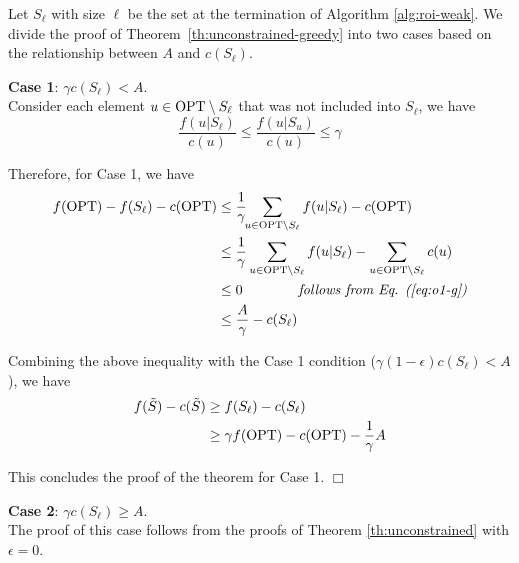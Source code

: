 \documentclass[10pt]{article} %
\theoremstyle{remark}
\newcommand{\OPT}{{\rm OPT}}
\begin{document}



Let $S_\ell$ with size $\ell$ be the set at the termination of Algorithm \ref{alg:roi-weak}. We divide the proof of Theorem~\ref{th:unconstrained-greedy} into two cases based on the relationship between $A$ and $c(S_\ell)$. 

    \textbf{Case 1}: $\gamma c(S_\ell) < A$.\\
    Consider each element $u \in \OPT \setminus S_\ell$ that was not included into $S_\ell$, we have
    \begin{equation}
    \label{eq:o1-g}
        \frac{f(u|S_\ell)}{c(u)} \leq \frac{f(u|S_u)}{c(u)} \leq \gamma
    \end{equation}
        
    Therefore, for Case 1, we have
    \begin{align*}
        f(\OPT)-f(S_\ell)-c(\OPT) &\leq \frac{1}{\gamma}\!\!\sum_{u \in \OPT \setminus S_{\ell}} f(u|S_\ell)-c(\OPT)\\
        &\leq \frac{1}{\gamma}\sum_{u \in \OPT \setminus S_{\ell}} f(u|S_\ell)-\sum_{u \in \OPT \setminus S_{\ell}} c(u) \\
        &\leq 0 \quad \quad\quad \quad \mbox{\it follows from  Eq. (\ref{eq:o1-g})}\\
        &\leq \frac{A}{\gamma}-c(S_\ell)
    \end{align*}

     
     Combining the above inequality with the Case 1 condition ($\gamma (1-\epsilon)c(S_\ell) < A$), we have 
     \begin{align*}
         f(\Tilde{S})-c(\Tilde{S})& \geq f(S_\ell)-c(S_\ell)\\
         &\geq \gamma f(\OPT)-c(\OPT)-\frac{1}{\gamma}A
     \end{align*}

    {This concludes the proof of the theorem for Case 1}. \hfill $\Box$


 
    \textbf{Case 2}: $\gamma c(S_\ell) \geq A$. \\
    The proof of this case follows from the proofs of Theorem \ref{th:unconstrained} with $\epsilon=0$.
    
\end{document}
